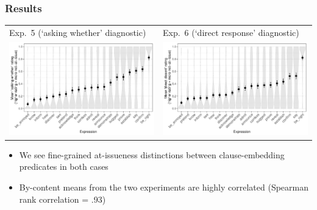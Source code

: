 \documentclass[compress, xcolor = dvipsnames, aspectratio=169]{beamer}
\begin{document}
	\begin{frame}[t]\frametitle{Results}\scriptsize

	      \centering
	      \begin{tabular}{p{.48\linewidth} p{.48\linewidth}}
	      	Exp.~5 (`asking whether' diagnostic)
	      	&
	      	Exp.~6 (`direct response' diagnostic)\\ 
	      	\includegraphics[width=\linewidth]{../../results/exp5/graphs/mean-ratings.pdf}%
	      	&
	      	\includegraphics[width=\linewidth]{../../results/exp6/graphs/mean-ratings.pdf}
	      	\\
	      \end{tabular}

	      \vfill

	      \begin{itemize}
	      	\item We see fine-grained at-issueness distinctions between clause-embedding predicates in both cases
	      	\item By-content means from the two experiments are highly correlated (Spearman rank correlation = .93)
	      \end{itemize}
	
	\end{frame}
\end{document}
